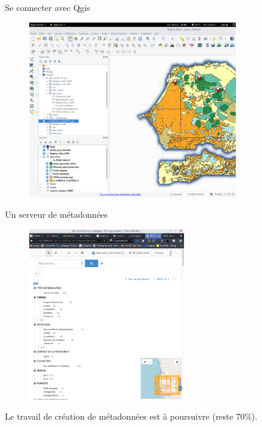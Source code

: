 \documentclass[newPxFont]{beamer}
\begin{document}
\begin{frame}[c]{Se connecter avec Qgis}
\vspace{-2em}
\begin{figure}
	\centering
	\includegraphics[width = 0.8\textwidth]{img/qgis_screenshot}
\end{figure}
\end{frame}

\begin{frame}[c]{Un serveur de métadonnées}
\vspace{-2em}
\begin{figure}
	\centering
	\includegraphics[width = 0.6\textwidth]{img/geonetwork}
\end{figure}
Le travail de création de métadonnées est à poursuivre (reste 70\%).
\end{frame}
\end{document}
